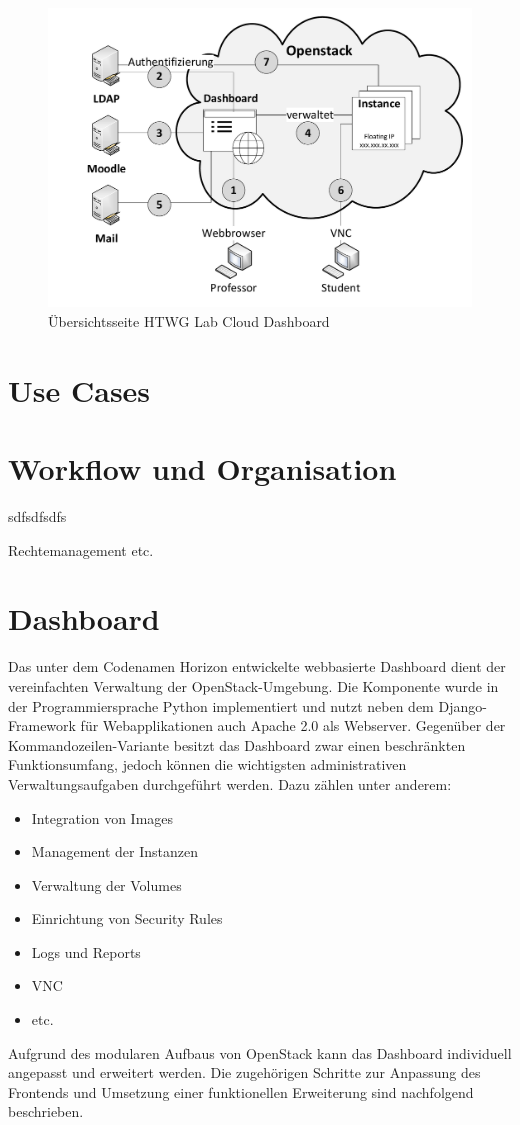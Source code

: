 \begin{figure}[H]
	\centering
	\includegraphics[scale=0.4]{img/overview.pdf}
\caption{Übersichtsseite HTWG Lab Cloud Dashboard}
\label{overview}
\FloatBarrier
\end{figure}

\section{Use Cases}

\section{Workflow und Organisation}
sdfsdfsdfs

Rechtemanagement etc.

\section{Dashboard}

Das unter dem Codenamen Horizon entwickelte webbasierte Dashboard dient der vereinfachten Verwaltung der OpenStack-Umgebung. Die Komponente wurde in der Programmiersprache Python implementiert und nutzt neben dem Django-Framework für Webapplikationen auch Apache 2.0 als Webserver. Gegenüber der Kommandozeilen-Variante besitzt das Dashboard zwar einen beschränkten Funktionsumfang, jedoch können die wichtigsten administrativen Verwaltungsaufgaben durchgeführt werden. Dazu zählen unter anderem:
\begin{itemize}
\item Integration von Images
\item Management der Instanzen
\item Verwaltung der Volumes
\item Einrichtung von Security Rules
\item Logs und Reports
\item VNC
\item etc.
\end{itemize}
Aufgrund des modularen Aufbaus von OpenStack kann das Dashboard individuell angepasst und erweitert werden. Die zugehörigen Schritte zur Anpassung des Frontends und Umsetzung einer funktionellen Erweiterung sind nachfolgend beschrieben.

